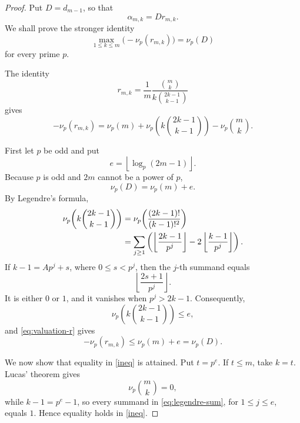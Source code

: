 \documentclass[10pt,a4paper]{amsart}
\newcommand{\vp}{\nu_p}
\begin{document}
\begin{proof}
Put \(D=d_{m-1}\), so that
\[
\alpha_{m,k}=Dr_{m,k}.
\]
We shall prove the stronger identity
\begin{equation}\label{eq:max-valuation}
\max_{1\leq k\leq m}\bigl(-\vp(r_{m,k})\bigr)=\vp(D)
\end{equation}
for every prime \(p\).

The identity
\begin{equation}\label{eq:r-simplified}
r_{m,k}
=
\frac{1}{m}
\frac{\binom{m}{k}}
{k\binom{2k-1}{k-1}}
\end{equation}
gives
\begin{equation}\label{eq:valuation-r}
-\vp(r_{m,k})
=
\vp(m)
+
\vp\!\left(k\binom{2k-1}{k-1}\right)
-
\vp\binom{m}{k}.
\end{equation}

First let \(p\) be odd and put
\[
e=\left\lfloor\log_p(2m-1)\right\rfloor.
\]
Because $p$ is odd and $2m$ cannot be a power of $p$,
\begin{equation}\label{eq:odd-D}
\vp(D)=\vp(m)+e.
\end{equation}
By Legendre's formula,
\begin{align}
\vp\!\left(k\binom{2k-1}{k-1}\right)
&=
\vp\!\left(\frac{(2k-1)!}{(k-1)!^2}\right)\notag\\
&=
\sum_{j\geq1}
\left(
\left\lfloor\frac{2k-1}{p^j}\right\rfloor
-
2\left\lfloor\frac{k-1}{p^j}\right\rfloor
\right).
\label{eq:legendre-sum}
\end{align}
If \(k-1=Ap^j+s\), where \(0\leq s<p^j\), then the \(j\)-th
summand equals
\[
\left\lfloor\frac{2s+1}{p^j}\right\rfloor.
\]
It is either \(0\) or \(1\), and it vanishes when \(p^j>2k-1\).
Consequently,
\[
\vp\!\left(k\binom{2k-1}{k-1}\right)\leq e,
\]
and \eqref{eq:valuation-r} gives
\begin{equation}\label{ineq}
-\vp(r_{m,k})\leq\vp(m)+e=\vp(D).
\end{equation}

We now show that equality in \eqref{ineq} is attained. Put \(t=p^e\).
If \(t\leq m\), take \(k=t\). Lucas' theorem gives
\[
\vp\binom{m}{k}=0,
\]
while \(k-1=p^e-1\), so every summand in
\eqref{eq:legendre-sum}, for \(1\leq j\leq e\), equals \(1\).
Hence equality holds in \eqref{ineq}.


\end{proof}
\end{document}
